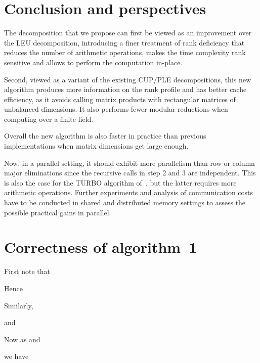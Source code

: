 \documentclass{article}
\begin{document}
 





\section{Conclusion and perspectives}

The decomposition that we propose can first be viewed as an improvement over the
LEU decomposition, introducing a finer treatment of rank deficiency that reduces
the number of arithmetic operations, makes the time complexity rank sensitive
and allows to perform the computation in-place.

Second, viewed as a variant of the existing CUP/PLE decompositions, this new
algorithm produces more information on the rank profile and has better cache
efficiency, as it avoids calling matrix products with rectangular matrices of
unbalanced dimensions. It also  performs fewer modular reductions when computing
over a finite field. 

Overall the new algorithm is also faster in practice than previous
implementations when matrix dimensions get large enough. 

Now, in a parallel setting, it should exhibit more parallelism than row or
column major eliminations since the recursive calls in step 2 and 3 are
independent. This is also the case for the
TURBO algorithm of~\cite{jgd:2002:PComp}, but the latter requires more
arithmetic operations. Further experiments and analysis of communication costs
have to be conducted in shared and distributed memory settings to assess the
possible practical gains in parallel.

{\small


}
\appendix
\renewcommand{\arraystretch}{.7}
\setlength{\arraycolsep}{.2\arraycolsep}

\section{Correctness of algorithm~1}
\label{app:pluq:correct}


First note that 



Hence



Similarly,

and 



Now as
 and

we have

 
\end{document}
